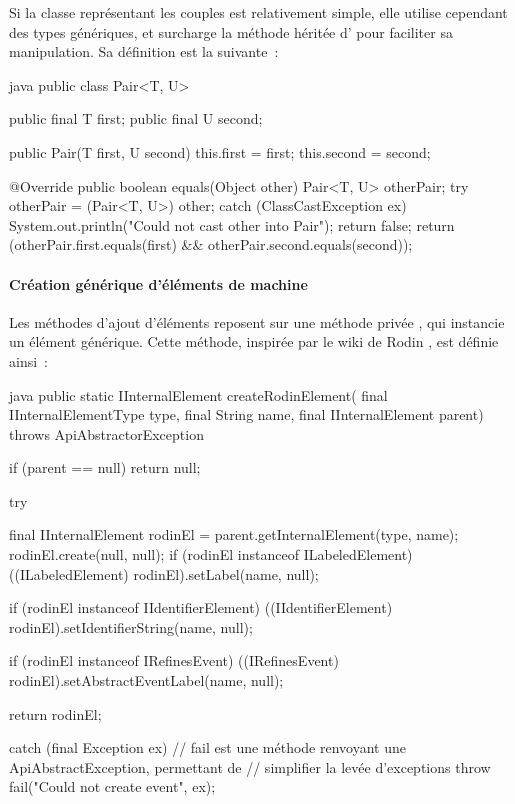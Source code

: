 Si la classe  représentant les couples est relativement simple, elle utilise cependant des types génériques, et surcharge la méthode  héritée %
d' pour faciliter sa manipulation.
Sa définition est la suivante~:

\begin{imtaCode}{java}
public class Pair<T, U> {
    public final T first;
    public final U second;

    public Pair(T first, U second) {
        this.first = first;
        this.second = second;
    }

    @Override
    public boolean equals(Object other) {
        Pair<T, U> otherPair;
        try {
            otherPair = (Pair<T, U>) other;
        } catch (ClassCastException ex) {
            System.out.println("Could not cast other into Pair");
            return false;
        }
        return (otherPair.first.equals(first) && otherPair.second.equals(second));
    }
}
\end{imtaCode}


\paragraph{Création générique d'éléments de machine}

Les méthodes d'ajout d'éléments reposent sur une méthode privée , qui instancie un élément générique.
Cette méthode, inspirée par le wiki de Rodin \cite{rodinwikicreateprojects}, est définie ainsi~:

\begin{imtaCode}{java}
public static IInternalElement createRodinElement(
            final IInternalElementType type,
            final String name,
            final IInternalElement parent)
    throws ApiAbstractorException
    {
        if (parent == null)
            return null;

        try {
            final IInternalElement rodinEl = parent.getInternalElement(type, name);
            rodinEl.create(null, null);
            if (rodinEl instanceof ILabeledElement)
                ((ILabeledElement) rodinEl).setLabel(name, null);

            if (rodinEl instanceof IIdentifierElement)
                ((IIdentifierElement) rodinEl).setIdentifierString(name, null);

            if (rodinEl instanceof IRefinesEvent)
                ((IRefinesEvent) rodinEl).setAbstractEventLabel(name, null);

            return rodinEl;

    } catch (final Exception ex) {
        // fail est une méthode renvoyant une ApiAbstractException, permettant de
        // simplifier la levée d'exceptions
        throw fail("Could not create event", ex);
    }
}
\end{imtaCode}

